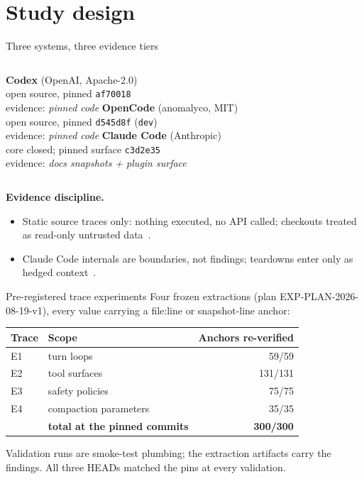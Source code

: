 \documentclass[aspectratio=169,11pt]{beamer}
\newcommand{\codex}[0]{Codex}
\newcommand{\occ}[0]{OpenCode}
\newcommand{\ccc}[0]{Claude Code}
\begin{document}
\section{Study design}

\begin{frame}{Three systems, three evidence tiers}
  \begin{columns}[T]
      \textbf{\codex{}} (OpenAI, Apache-2.0)\\
      open source, pinned \texttt{af70018}\\
      evidence: \emph{pinned code}
      \textbf{\occ{}} (anomalyco, MIT)\\
      open source, pinned \texttt{d545d8f} (\texttt{dev})\\
      evidence: \emph{pinned code}
      \textbf{\ccc{}} (Anthropic)\\
      core closed; pinned surface \texttt{c3d2e35}\\
      evidence: \emph{docs snapshots + plugin surface}
  \end{columns}

  \medskip
  \textbf{Evidence discipline.}
  \begin{itemize}
    \item Static source traces only: nothing executed, no API called;
      checkouts treated as read-only untrusted data~\citep{codexRepo,opencodeRepo,claudeCodeSurface}.
    \item \ccc{} internals are boundaries, not findings; teardowns enter
      only as hedged context~\citep{minusXTeardown,agiflowInternals,tenguDecoded}.
  \end{itemize}
\end{frame}

\begin{frame}{Pre-registered trace experiments}
  Four frozen extractions (plan EXP-PLAN-2026-08-19-v1), every value
  carrying a file:line or snapshot-line anchor:
  \begin{center}
    \small
    \begin{tabular}{llr}
      \toprule
      Trace & Scope & Anchors re-verified\\
      \midrule
      E1 & turn loops & 59/59\\
      E2 & tool surfaces & 131/131\\
      E3 & safety policies & 75/75\\
      E4 & compaction parameters & 35/35\\
      \midrule
      & \textbf{total at the pinned commits} & \textbf{300/300}\\
      \bottomrule
    \end{tabular}
  \end{center}
  Validation runs are smoke-test plumbing; the extraction artifacts carry
  the findings. All three HEADs matched the pins at every validation.
\end{frame}
\end{document}
